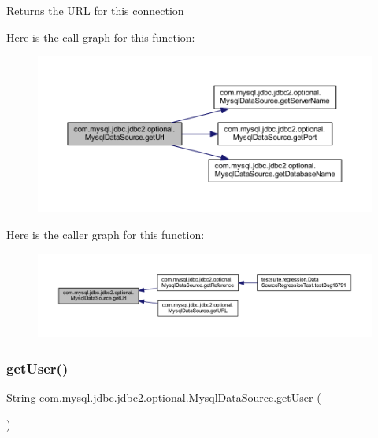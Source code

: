 \begin{DoxyReturn}{Returns}
the U\+RL for this connection 
\end{DoxyReturn}
Here is the call graph for this function\+:
\nopagebreak
\begin{figure}[H]
\begin{center}
\leavevmode
\includegraphics[width=350pt]{classcom_1_1mysql_1_1jdbc_1_1jdbc2_1_1optional_1_1_mysql_data_source_a5e66ffff5f2e60b902e05cbb12f32a6c_cgraph}
\end{center}
\end{figure}
Here is the caller graph for this function\+:
\nopagebreak
\begin{figure}[H]
\begin{center}
\leavevmode
\includegraphics[width=350pt]{classcom_1_1mysql_1_1jdbc_1_1jdbc2_1_1optional_1_1_mysql_data_source_a5e66ffff5f2e60b902e05cbb12f32a6c_icgraph}
\end{center}
\end{figure}
\mbox{\label{classcom_1_1mysql_1_1jdbc_1_1jdbc2_1_1optional_1_1_mysql_data_source_a91ebbda8d7cd1ddd53bf681738155854}} 
\subsubsection{\texorpdfstring{get\+User()}{getUser()}}
{\footnotesize\ttfamily String com.\+mysql.\+jdbc.\+jdbc2.\+optional.\+Mysql\+Data\+Source.\+get\+User (\begin{DoxyParamCaption}{ }\end{DoxyParamCaption})}

